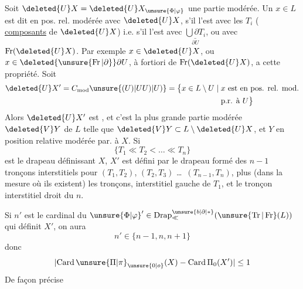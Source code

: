  Soit $\deleted{U}X=\deleted{U}X_{\unsure{\Phi|\varphi}}$ une partie modérée. Un $x\in L$ est dit en pos. rel. modérée avec $\deleted{U}X$, s'il l'est avec les $T_i$ ( \uline{composants} de $\deleted{U}X$) i.e. s'il l'est avec $\underset{\partial U}{\underline{\bigcup\partial T_i}}$, ou  avec $\operatorname{Fr}(\deleted{U}X)$.
Par exemple  $x\in\deleted{U}X$, ou $x\in\deleted{\unsure{\operatorname{Fr}|\partial}}\partial U$, à fortiori de $\operatorname{Fr}(\deleted{U}X)$, a cette propriété. Soit
\[
\begin{aligned}
\deleted{U}X'=C_{\mathrm{mod}}\unsure{(U)|U U)|U)}=\bigl\{x\in L\setminus U\mid{}&x\text{ est en pos. rel. mod.}\\
&\text{p.r. à }U\bigr\}
\end{aligned}
\]
Alors  $\deleted{U}X'$ est , et c'est la plus grande partie modérée $\deleted{V}Y$ de $L$ telle que $\deleted{V}Y\subset L\setminus\deleted{U}X$, et $Y$ en position relative modérée par. à $X$. Si
\[
\{T_1\ll T_2<\ldots\ll T_n\}
\]
est le drapeau définissant  $X$, $X'$ est défini par le drapeau formé des $n-1$ tronçons interstitiels  pour $(T_1,T_2)$, $(T_2,T_3)$ \ldots\ $(T_{n-1},T_n)$, plus (dans la mesure où ils existent) les tronçons, interstitiel gauche de $T_1$, et le tronçon interstitiel droit du $n$. 

Si $n'$ est le cardinal du $ {\unsure{\Phi|\varphi}}'\in\operatorname{Drap}_{\ll}^{\unsure{b|\partial|*}}(\unsure{\operatorname{Tr}|\operatorname{Fr}}(L))$ qui définit $X'$, on aura
\[
n'\in\{n-1,n,n+1\}
\]
donc
\[
\lvert\operatorname{Card}\unsure{\Pi|\pi}_{\unsure{0|o}}(X)-\operatorname{Card}\Pi_0(X')\rvert\leq 1
\]
De façon précise


